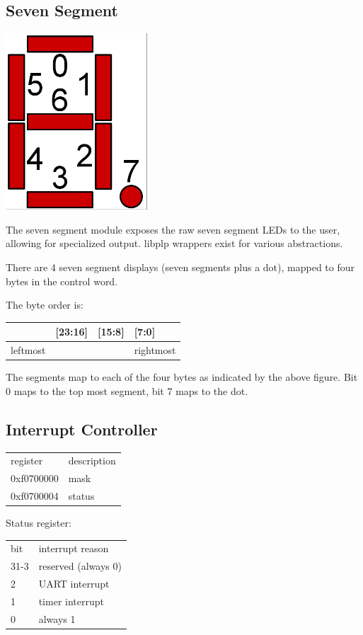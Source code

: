 \documentclass{article}
\begin{document}
\subsection{Seven Segment}
\begin{center}
\includegraphics[scale=0.5]{../../images/sseg.png}
\end{center}
The seven segment module exposes the raw seven segment LEDs to the user, allowing for specialized output. libplp wrappers exist for various abstractions.

There are 4 seven segment displays (seven segments plus a dot), mapped to four bytes in the control word.

The byte order is: 

\begin{tabular}{ | l | l | l | l |}
\hline
[31:24] & [23:16] & [15:8] & [7:0] \\
\hline
leftmost & & & rightmost \\
\hline
\end{tabular}

The segments map to each of the four bytes as indicated by the above figure. Bit 0 maps to the top most segment, bit 7 maps to the dot. 

\subsection{Interrupt Controller}

\begin{tabular}{ | l | l | }
\hline
register & description \\
0xf0700000 & mask \\
0xf0700004 & status \\
\hline
\end{tabular}

Status register: 

\begin{tabular}{ | l | l | }
\hline
bit & interrupt reason \\
31-3 & reserved (always 0) \\
2 & UART interrupt \\
1 & timer interrupt \\
0 & always 1 \\
\hline
\end{tabular}
\end{document}
